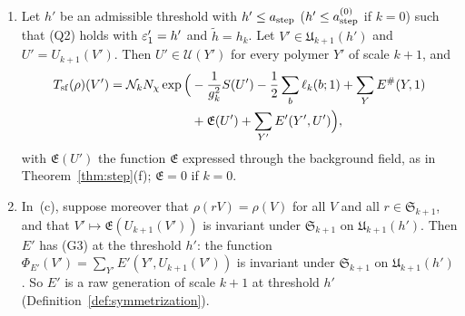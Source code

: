 \begin{lemma}
\begin{enumerate}[label=(\alph*)]
\item Let $h'$ be an admissible threshold with $h'\le a_{\rm step}$ ($h'\le a^{(0)}_{\rm step}$ if $k=0$) such that (Q2) holds with $\varepsilon'_1=h'$ and $\tilde h=h_k$. Let $V'\in\mathfrak U_{k+1}(h')$ and $U'=U_{k+1}(V')$. Then $U'\in\mathcal U(Y')$ for every polymer $Y'$ of scale $k+1$, and
\[
\begin{aligned}
T_{\rm sf}(\rho)(V')=\mathcal N_kN_\chi\exp\Big(&-\frac1{g_k^2}S(U')-\frac12\sum_b\ell_k(b;1)+\sum_YE^\#(Y,1)\\
&+\mathfrak E(U')+\sum_{Y'}E'(Y',U')\Big),
\end{aligned}
\]
with $\mathfrak E(U')$ the function $\mathfrak E$ expressed through the background field, as in Theorem~\ref{thm:step}(f); $\mathfrak E=0$ if $k=0$.
\item In~(c), suppose moreover that $\rho(rV)=\rho(V)$ for all $V$ and all $r\in\mathfrak S_{k+1}$, and that $V'\mapsto\mathfrak E(U_{k+1}(V'))$ is invariant under $\mathfrak S_{k+1}$ on $\mathfrak U_{k+1}(h')$. Then $E'$ has (G3) at the threshold $h'$: the function $\Phi_{E'}(V')=\sum_{Y'}E'(Y',U_{k+1}(V'))$ is invariant under $\mathfrak S_{k+1}$ on $\mathfrak U_{k+1}(h')$. So $E'$ is a raw generation of scale $k+1$ at threshold $h'$ (Definition~\ref{def:symmetrization}).
\end{enumerate}
\end{lemma}

